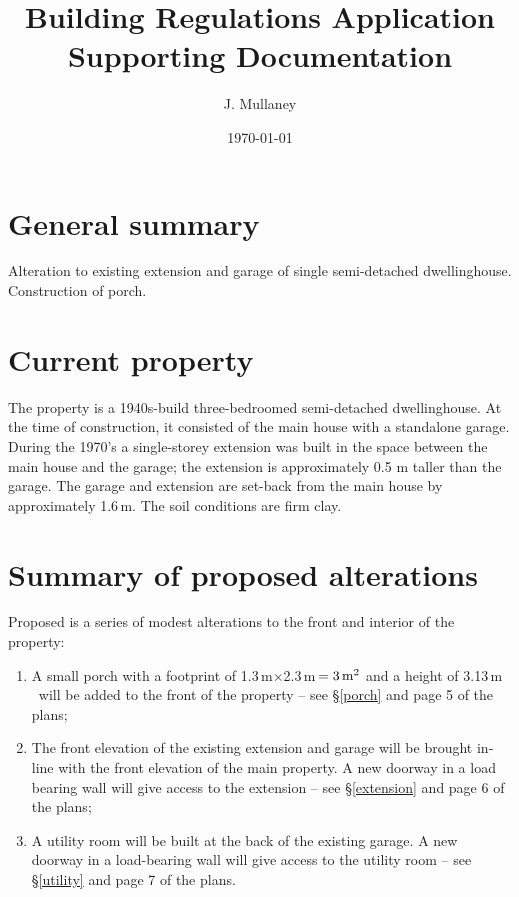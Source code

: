 \documentclass{extension}
\newcommand{\m}{\,$\mathrm{m}$}
\begin{document}
\title{Building Regulations Application \\[2mm]
Supporting Documentation}
\author{J. Mullaney}
\date{\today}

\maketitle

\vspace{5mm}
\section{General summary}
Alteration to existing extension and garage of single semi-detached dwellinghouse. Construction of porch.

\section{Current property}
The property is a 1940s-build three-bedroomed semi-detached dwellinghouse. At the time of construction, it consisted of the main house with a standalone garage. During the 1970’s a single-storey extension was built in the space between the main house and the garage; the extension is approximately 0.5 m taller than the garage. The garage and extension are set-back from the main house by approximately 1.6\,m. The soil conditions are firm clay.

\section{Summary of proposed alterations}
Proposed is a series of modest alterations to the front and interior of the property:
\begin{enumerate}
  \item A small porch with a footprint of 1.3\m$\times$2.3\m\,$=3\,{\rm m^2}$ and a height of 3.13\m\ will be added to the front of the property -- see \S\ref{porch} and page 5 of the plans;
  \item The front elevation of the existing extension and garage will be brought in-line with the front elevation of the main property. A new doorway in a load bearing wall will give access to the extension -- see \S\ref{extension} and page 6 of the plans;\\
  \item A utility room will be built at the back of the existing garage. A new doorway in a load-bearing wall will give access to the utility room -- see \S\ref{utility} and page 7 of the plans.
\end{enumerate}
\end{document}
